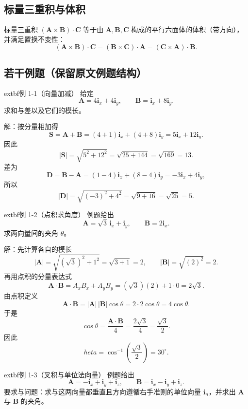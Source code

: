\subsection{标量三重积与体积}
标量三重积 $(\mathbf{A}\times\mathbf{B})\cdot\mathbf{C}$ 等于由 $\mathbf{A},\mathbf{B},\mathbf{C}$ 构成的平行六面体的体积（带方向），并满足置换不变性：
\[
(\mathbf{A}\times\mathbf{B})\cdot\mathbf{C}=(\mathbf{B}\times\mathbf{C})\cdot\mathbf{A}=(\mathbf{C}\times\mathbf{A})\cdot\mathbf{B}.
\]

\subsection{若干例题（保留原文例题结构）}
	extbf{例 1-1（向量加减）} 给定
\[
\mathbf{A}=4\mathbf{i}_x+4\mathbf{i}_y,\qquad \mathbf{B}=\mathbf{i}_x+8\mathbf{i}_y.
\]
求和与差以及它们的模长。

解：按分量相加得
\[
\mathbf{S}=\mathbf{A}+\mathbf{B}=(4+1)\mathbf{i}_x+(4+8)\mathbf{i}_y=5\mathbf{i}_x+12\mathbf{i}_y.
\]
因此
\[
|\mathbf{S}|=\sqrt{5^2+12^2}=\sqrt{25+144}=\sqrt{169}=13.
\]
差为
\[
\mathbf{D}=\mathbf{B}-\mathbf{A}=(1-4)\mathbf{i}_x+(8-4)\mathbf{i}_y=-3\mathbf{i}_x+4\mathbf{i}_y,
\]
所以
\[
|\mathbf{D}|=\sqrt{(-3)^2+4^2}=\sqrt{9+16}=\sqrt{25}=5.
\]

	extbf{例 1-2（点积求角度）} 例题给出
\[
\mathbf{A}=\sqrt{3}\,\mathbf{i}_x+\mathbf{i}_y,\qquad \mathbf{B}=2\mathbf{i}_x.
\]
求两向量间的夹角 $\theta$。

解：先计算各自的模长
\[
|\mathbf{A}|=\sqrt{(\sqrt{3})^2+1^2}=\sqrt{3+1}=2,\qquad |\mathbf{B}|=\sqrt{(2)^2}=2.
\]
再用点积的分量表达式
\[
\mathbf{A}\cdot\mathbf{B}=A_xB_x+A_yB_y=(\sqrt{3})(2)+1\cdot 0=2\sqrt{3}.
\]
由点积定义
\[
\mathbf{A}\cdot\mathbf{B}=|\mathbf{A}|\,|\mathbf{B}|\cos\theta=2\cdot 2\cos\theta=4\cos\theta.
\]
于是
\[
\cos\theta=\dfrac{\mathbf{A}\cdot\mathbf{B}}{4}=\dfrac{2\sqrt{3}}{4}=\dfrac{\sqrt{3}}{2}.
\]
因此
\[
	heta=\cos^{-1}\left(\dfrac{\sqrt{3}}{2}\right)=30^{\circ}.
\]

	extbf{例 1-3（叉积与单位法向量）} 例题给出
\[
\mathbf{A}=-\mathbf{i}_x+\mathbf{i}_y+\mathbf{i}_z,\qquad \mathbf{B}=\mathbf{i}_x-\mathbf{i}_y+\mathbf{i}_z.
\]
要求与问题：求与这两向量都垂直且方向遵循右手准则的单位向量 $\mathbf{i}_n$，并求出 $\mathbf{A}$ 与 $\mathbf{B}$ 的夹角。

